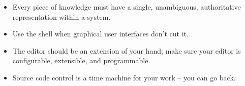 \begin{itemize}
%
%
  \item {}
    Every piece of knowledge must have a single, unambiguous, authoritative representation within a system.
%
%
%
%
  \item {}
    Use the shell when graphical user interfaces don't cut it.
  \item {}
    The editor should be an extension of your hand; make sure your editor is configurable, extensible, and programmable.
  \item {}
    Source code control is a time machine for your work – you can go back.
%
%
%
%
%
%
%


\end{itemize}
